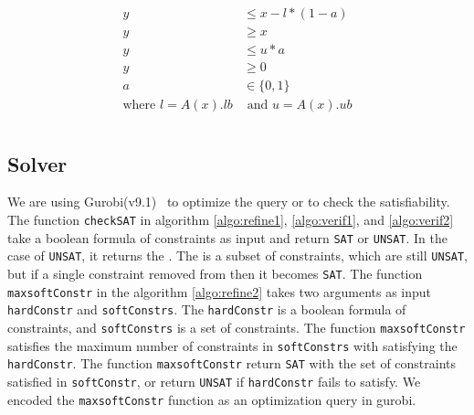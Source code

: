\begin{align}
    \label{eq:reluexact}
    \begin{split}
        y &\leq x - l*(1-a) \\
        y &\geq x \\
        y &\leq u*a \\
        y &\geq 0 \\
        a &\in \{0,1\} \\ 
        \text{where }l = A(x).lb &\text{ and }u = A(x).ub \\
    \end{split}
\end{align}


\subsection{Solver}
\label{sec:solver}

We are using Gurobi(v9.1)~\cite{gurobioptimizer} to optimize the query or to check the satisfiability. 
The function \texttt{checkSAT} in algorithm \ref{algo:refine1}, \ref{algo:verif1}, and \ref{algo:verif2} 
take a boolean formula of constraints as input and return \texttt{SAT} or \texttt{UNSAT}. 
In the case of \texttt{UNSAT}, it returns the \unsatcore{}. 
The \unsatcore{} is a subset of constraints, which are still \texttt{UNSAT}, 
but if a single constraint removed from \unsatcore{} then it becomes \texttt{SAT}.
The function \texttt{maxsoftConstr} in the algorithm \ref{algo:refine2} takes two arguments as input \texttt{hardConstr} and \texttt{softConstrs}. 
The \texttt{hardConstr} is a boolean formula of constraints, and \texttt{softConstrs} is a set of constraints. 
The function \texttt{maxsoftConstr} satisfies the maximum number of constraints in \texttt{softConstrs} with satisfying the \texttt{hardConstr}. 
The function \texttt{maxsoftConstr} return \texttt{SAT} with the set of constraints satisfied in \texttt{softConstr}, or return
\texttt{UNSAT} if \texttt{hardConstr} fails to satisfy. We encoded the \texttt{maxsoftConstr} function as an optimization 
query in gurobi. 



